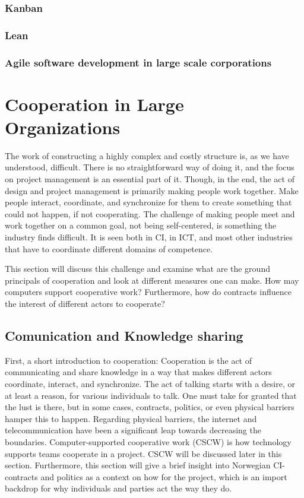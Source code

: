 \subsubsection{Kanban}
\subsubsection{Lean}
\subsubsection{Agile software development in large scale corporations}

\section{Cooperation in Large Organizations}
The work of constructing a highly complex and costly structure is, as we have understood, difficult. There is no straightforward way of doing it, and the focus on project management is an essential part of it. Though, in the end, the act of design and project management is primarily making people work together. Make people interact, coordinate, and synchronize for them to create something that could not happen, if not cooperating. The challenge of making people meet and work together on a common goal, not being self-centered, is something the industry finds difficult. It is seen both in CI, in ICT, and most other industries that have to coordinate different domains of competence. 

This section will discuss this challenge and examine what are the ground principals of cooperation and look at different measures one can make. How may computers support cooperative work? Furthermore, how do contracts influence the interest of different actors to cooperate? 

\subsection{Comunication and Knowledge sharing}
First, a short introduction to cooperation: Cooperation is the act of communicating and share knowledge in a way that makes different actors coordinate, interact, and synchronize. The act of talking starts with a desire, or at least a reason, for various individuals to talk. One must take for granted that the lust is there, but in some cases, contracts, politics, or even physical barriers hamper this to happen. Regarding physical barriers, the internet and telecommunication have been a significant leap towards decreasing the boundaries. Computer-supported cooperative work (CSCW) is how technology supports teams cooperate in a project. CSCW will be discussed later in this section. Furthermore, this section will give a brief insight into Norwegian CI- contracts and politics as a context on how for the project, which is an import backdrop for why individuals and parties act the way they do. 

